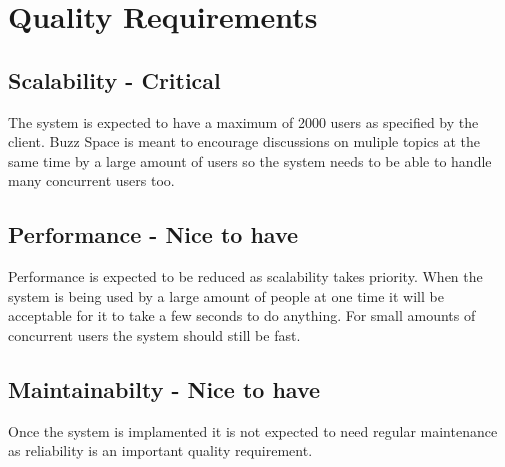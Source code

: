 \section{Quality Requirements}
\subsection{Scalability - Critical}
The system is expected to have a maximum of 2000 users as specified by the client. Buzz Space is meant to encourage discussions on muliple topics at the same time by a large amount of users so the system needs to be able to handle many concurrent users too.

\subsection{Performance - Nice to have}
Performance is expected to be reduced as scalability takes priority. When the system is being used by a large amount of people at one time it will be acceptable for it to take a few seconds to do anything. For small amounts of concurrent users the system should still be fast.

\subsection{Maintainabilty - Nice to have}
Once the system is implamented it is not expected to need regular maintenance as reliability is an important quality requirement.

